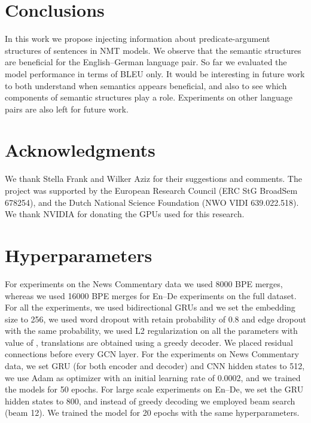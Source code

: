 \documentclass[11pt,a4paper]{article}
\begin{document}
\section{Conclusions}
In this work we propose injecting information about predicate-argument structures of sentences in NMT models.
We observe that the semantic structures are beneficial for the English--German language pair.
So far we evaluated the model performance in terms of BLEU only. 
It would be interesting in future work to both understand when semantics appears beneficial, and also to see which components of semantic structures play a role.
Experiments on other language pairs are also left for future work.


\section*{Acknowledgments}
We thank Stella Frank and Wilker Aziz for their suggestions and comments.
The project was supported by the European Research Council (ERC StG BroadSem 678254), and the Dutch National Science Foundation (NWO VIDI 639.022.518). 
We thank NVIDIA for donating the GPUs used for this research.





\appendix
\newpage

\newpage


\section{Hyperparameters}
\label{sec:hyperparameters}
For experiments on the News Commentary data we used 8000 BPE merges, whereas we used 16000 BPE merges for En--De experiments on the full dataset.
For all the experiments, we used bidirectional GRUs and we set the embedding size to 256, we used word dropout with retain probability of 0.8 and edge dropout with the same probability, we used L2 regularization on all the parameters with value of , translations are obtained using a greedy decoder.
We placed residual connections \cite{he2016deep} before every GCN layer.
For the experiments on News Commentary data, we set GRU (for both encoder and decoder) and CNN hidden states to 512, we use Adam \cite{kingma2015adam} as optimizer with an initial learning rate of 0.0002, and we trained the models for 50 epochs.
For large scale experiments on En--De, we set the GRU hidden states to 800, and instead of greedy decoding we employed beam search (beam 12). 
We trained the model for 20 epochs with the same hyperparameters.
\end{document}
